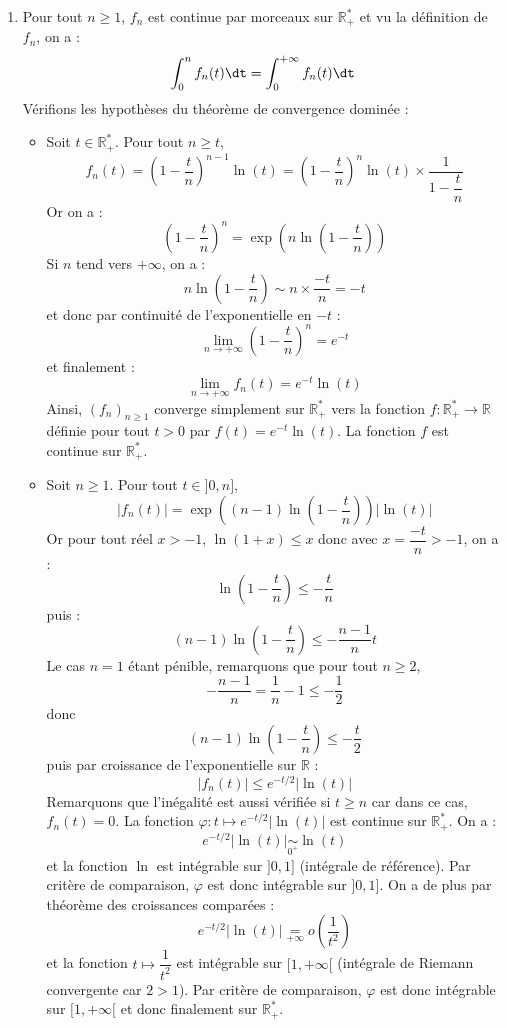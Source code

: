 \documentclass[a4paper,10pt]{report}
\begin{document}
\corr \begin{enumerate}
\item Pour tout $n \geq 1$, $f_n$ est continue par morceaux sur $\mathbb{R}_+^{*}$ et vu la définition de $f_n$, on a :
$$ \int_{0}^n f_n(t) \dt  = \int_{0}^{+ \infty} f_n(t) \dt$$
Vérifions les hypothèses du théorème de convergence dominée :
\begin{itemize}
\item Soit $t \in \mathbb{R}_+^{*}$. Pour tout $n \geq t$,
$$ f_n(t) = \left( 1 - \dfrac{t}{n} \right)^{n-1}\ln(t) = \left( 1 - \dfrac{t}{n} \right)^{n}\ln(t) \times \dfrac{1}{1-\dfrac{t}{n}}$$
Or on a :
$$  \left( 1 - \dfrac{t}{n} \right)^{n} = \exp \left( n \ln \left( 1 - \dfrac{t}{n} \right)\right)$$
Si $n$ tend vers $+ \infty$, on a :
$$ n \ln \left( 1 - \dfrac{t}{n} \right) \sim n \times \dfrac{-t}{n} = -t$$
et donc par continuité de l'exponentielle en $-t$ :
$$ \lim_{n \rightarrow + \infty} \left( 1 - \dfrac{t}{n} \right)^{n} = e^{-t}$$
et finalement :
$$ \lim_{n \rightarrow + \infty} f_n(t) = e^{-t} \ln(t)$$
Ainsi, $(f_n)_{n \geq 1}$ converge simplement sur $\mathbb{R}_+^{*}$ vers la fonction $f: \mathbb{R}_+^{*} \rightarrow \mathbb{R}$ définie pour tout $t>0$ par $f(t) =e^{-t} \ln(t)$. La fonction $f$ est continue sur $\mathbb{R}_+^{*}$.
\item Soit $n \geq 1$. Pour tout $t \in ]0,n]$,
$$ \vert f_n(t) \vert =  \exp \left( (n-1) \ln \left( 1 - \dfrac{t}{n} \right)\right) \vert \ln(t) \vert$$
Or pour tout réel $x>-1$, $\ln(1+x) \leq x$ donc avec $x= \dfrac{-t}{n}>-1$, on a :
$$ \ln \left( 1 - \dfrac{t}{n} \right) \leq - \dfrac{t}{n}$$
puis :
$$ (n-1) \ln \left( 1 - \dfrac{t}{n} \right) \leq - \dfrac{n-1}{n} t $$
Le cas $n=1$ étant pénible, remarquons que pour tout $n \geq 2$,
$$ - \dfrac{n-1}{n} = \dfrac{1}{n} - 1 \leq -\dfrac{1}{2}$$
donc 
$$ (n-1) \ln \left( 1 - \dfrac{t}{n}\right) \leq  - \dfrac{t}{2} $$
puis par croissance de l'exponentielle sur $\mathbb{R}$ :
$$ \vert f_n(t) \vert \leq e^{-t/2} \vert \ln(t) \vert $$
Remarquons que l'inégalité est aussi vérifiée si $t \geq n$ car dans ce cas, $f_n(t)=0$. La fonction $ \varphi : t \mapsto e^{-t/2} \vert \ln(t) \vert$ est continue sur $\mathbb{R}_+^{*}$. On a :
$$ e^{-t/2} \vert \ln(t) \vert \underset{0^+}{\sim} \ln(t)$$
et la fonction $\ln$ est intégrable sur $]0,1]$ (intégrale de référence). Par critère de comparaison, $\varphi$ est donc intégrable sur $]0,1]$. On a de plus par théorème des croissances comparées :
$$ e^{-t/2} \vert \ln(t) \vert \underset{+ \infty}{=} o \left( \dfrac{1}{t^2} \right)$$
et la fonction $t \mapsto \dfrac{1}{t^2}$ est intégrable sur $[1, + \infty[$ (intégrale de Riemann convergente car $2>1$). Par critère de comparaison, $\varphi$ est donc intégrable sur $[1, + \infty[$ et donc finalement sur $\mathbb{R}_+^{*}$.

\end{itemize}
\end{enumerate}
\end{document}
